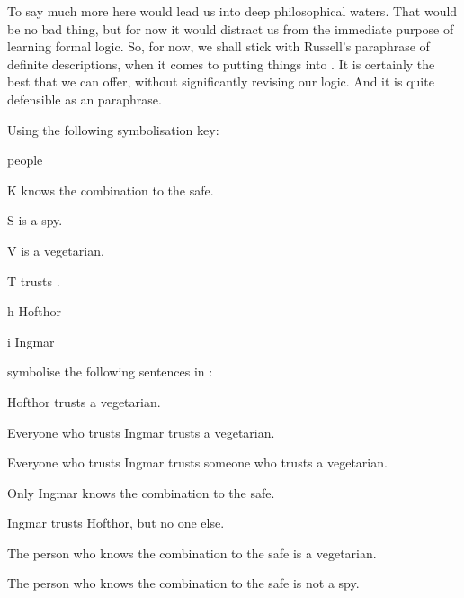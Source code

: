 To say much more here would lead us into deep philosophical waters. That would be no bad thing, but for now it would distract us from the immediate purpose of learning formal logic. So, for now, we shall stick with Russell's paraphrase of definite descriptions, when it comes to putting things into \FOL. It is certainly the best that we can offer, without significantly revising our logic. And it is quite defensible as an paraphrase. 



\practiceproblems

\problempart
Using the following symbolisation key:
\begin{ekey}
\item[\domain] people
\item[K]  knows the combination to the safe.
\item[S]  is a spy.
\item[V]  is a vegetarian.
\item[T]  trusts .
\item[h] Hofthor
\item[i] Ingmar
\end{ekey}
symbolise the following sentences in \FOL:
\begin{earg}
\item Hofthor trusts a vegetarian.
\item Everyone who trusts Ingmar trusts a vegetarian.
\item Everyone who trusts Ingmar trusts someone who trusts a vegetarian.
\item Only Ingmar knows the combination to the safe.
\item Ingmar trusts Hofthor, but no one else.
\item The person who knows the combination to the safe is a vegetarian.
\item The person who knows the combination to the safe is not a spy.
\end{earg}


